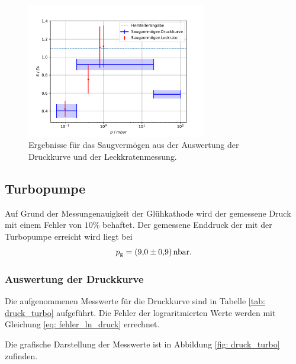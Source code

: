 \begin{figure}[h]
  \centering
  \includegraphics[width=0.7\textwidth]{../Messdaten/plots/dreh/dreh_leck_und_druck.pdf}
  \caption{Ergebnisse für das Saugvermögen aus der Auswertung der Druckkurve und der Leckkratenmessung.}
  \label{fig: dreh_druck_leck}
\end{figure}

\subsection{Turbopumpe}
Auf Grund der Messungenauigkeit der Glühkathode wird der gemessene
Druck mit einem Fehler von $10\%$ behaftet.
Der gemessene Enddruck der mit der Turbopumpe erreicht wird liegt bei
\begin{equation}
  \label{eq:enddruck_drehschieber}
  p_{\mathrm{g}}=\SI{9.0 \pm 0.9}{\nano\bar}.
\end{equation}

\subsubsection{Auswertung der Druckkurve}
Die aufgenommenen Messwerte für die Druckkurve sind in Tabelle \ref{tab: druck_turbo}
aufgeführt. Die Fehler der lograritmierten Werte werden mit Gleichung \eqref{eq: fehler_ln_druck} errechnet.


Die grafische Darstellung der Messwerte ist in Abbildung \ref{fig: druck_turbo} zufinden.

